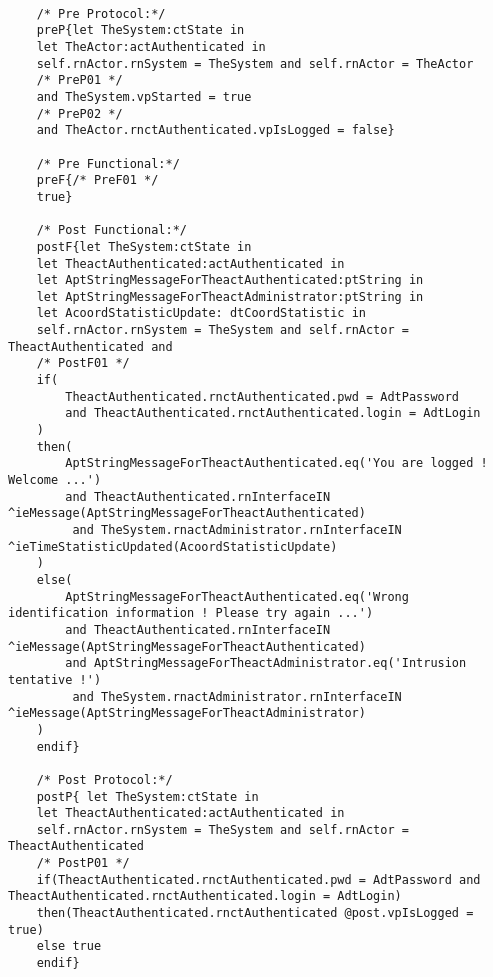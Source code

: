 	\scriptsize
	\vspace{0.5cm}
	\begin{lstlisting}[style=MessirStyle,firstnumber=auto,captionpos=b,caption={\msrmessir (MCL-oriented) specification of the operation \emph{oeLogin}.},label=OM-actAuthenticated-oeLogin-MCL-LST]

	/* Pre Protocol:*/ 
	preP{let TheSystem:ctState in
	let TheActor:actAuthenticated in
	self.rnActor.rnSystem = TheSystem and self.rnActor = TheActor
	/* PreP01 */
	and TheSystem.vpStarted = true
	/* PreP02 */
	and TheActor.rnctAuthenticated.vpIsLogged = false}
	
	/* Pre Functional:*/
	preF{/* PreF01 */
	true}
	
	/* Post Functional:*/ 
	postF{let TheSystem:ctState in
	let TheactAuthenticated:actAuthenticated in
	let AptStringMessageForTheactAuthenticated:ptString in
	let AptStringMessageForTheactAdministrator:ptString in
	let AcoordStatisticUpdate: dtCoordStatistic in
	self.rnActor.rnSystem = TheSystem and self.rnActor = TheactAuthenticated and
	/* PostF01 */
	if(
		TheactAuthenticated.rnctAuthenticated.pwd = AdtPassword 
		and TheactAuthenticated.rnctAuthenticated.login = AdtLogin
	)
	then(
		AptStringMessageForTheactAuthenticated.eq('You are logged ! Welcome ...') 
		and TheactAuthenticated.rnInterfaceIN ^ieMessage(AptStringMessageForTheactAuthenticated)
		 and TheSystem.rnactAdministrator.rnInterfaceIN ^ieTimeStatisticUpdated(AcoordStatisticUpdate)
	)
	else(
		AptStringMessageForTheactAuthenticated.eq('Wrong identification information ! Please try again ...') 
		and TheactAuthenticated.rnInterfaceIN ^ieMessage(AptStringMessageForTheactAuthenticated) 
		and AptStringMessageForTheactAdministrator.eq('Intrusion tentative !')
		 and TheSystem.rnactAdministrator.rnInterfaceIN ^ieMessage(AptStringMessageForTheactAdministrator)
	)
	endif}
	
	/* Post Protocol:*/ 
	postP{ let TheSystem:ctState in
	let TheactAuthenticated:actAuthenticated in
	self.rnActor.rnSystem = TheSystem and self.rnActor = TheactAuthenticated
	/* PostP01 */
	if(TheactAuthenticated.rnctAuthenticated.pwd = AdtPassword and TheactAuthenticated.rnctAuthenticated.login = AdtLogin)
	then(TheactAuthenticated.rnctAuthenticated @post.vpIsLogged = true)
	else true
	endif}
	
	\end{lstlisting}
	\normalsize 
	
	
	
	
	
